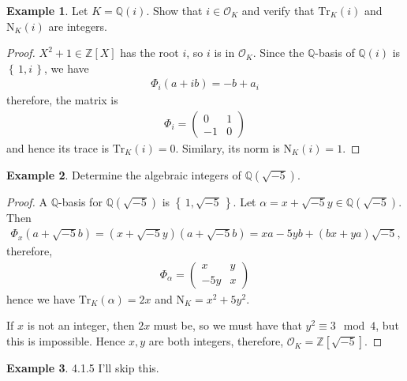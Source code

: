 \documentclass[a4paper]{book}
\theoremstyle{definition}
\newtheorem{example}{Example}[definition]
\newcommand{\set}[1]{\left\{\, #1 \,\right\}}
\begin{document}
\begin{example}
    Let \(K = \mathbb{Q}(i)\). Show that \(i \in \mathcal{O}_K\) and verify that \(\mathrm{Tr}_K(i)\) and \(\mathrm{N}_K(i)\) are integers.
\end{example}
\begin{proof}
    \(X^2 + 1 \in \mathbb{Z}[X]\) has the root \(i\), so \(i\) is in \(\mathcal{O}_K\). Since the \(\mathbb{Q}\)-basis of \(\mathbb{Q}(i)\) is \(\set{1, i}\), we have
    \begin{align*}
        \Phi_i(a + ib) = -b + a_i
    \end{align*}
    therefore, the matrix is
    \begin{align*}
        \Phi_i =
        \begin{pmatrix}
            0 & 1 \\ -1 & 0
        \end{pmatrix}
    \end{align*}
    and hence its trace is \(\mathrm{Tr}_K(i) = 0\). Similary, its norm is \(\mathrm{N}_K(i) = 1\).
\end{proof}
\begin{example}
    Determine the algebraic integers of \(\mathbb{Q}(\sqrt{-5})\).
\end{example}
\begin{proof}
    A \(\mathbb{Q}\)-basis for \(\mathbb{Q}(\sqrt{-5})\) is \(\set{1, \sqrt{-5}}\). Let \(\alpha = x + \sqrt{-5}y \in \mathbb{Q}(\sqrt{-5})\). Then
    \begin{align*}
        \Phi_x (a + \sqrt{-5} b) = (x + \sqrt{-5}y)(a + \sqrt{-5}b) = xa -5 yb + (bx + ya) \sqrt{-5} \text{,} 
    \end{align*}
    therefore,
    \begin{align*}
        \Phi_\alpha =
        \begin{pmatrix}
            x & y \\ -5 y & x
        \end{pmatrix}
    \end{align*}
    hence we have \(\mathrm{Tr}_K(\alpha) = 2x\) and \(\mathrm{N}_K = x^2 + 5y^2\).

    If \(x\) is not an integer, then \(2x\) must be, so we must have that \(y^2 \equiv 3 \mod 4\), but this is impossible. Hence \(x, y\) are both integers, therefore, \(\mathcal{O}_K = \mathbb{Z}[\sqrt{-5}]\).
\end{proof}
\begin{example}
    4.1.5 I'll skip this.
\end{example}
\end{document}
